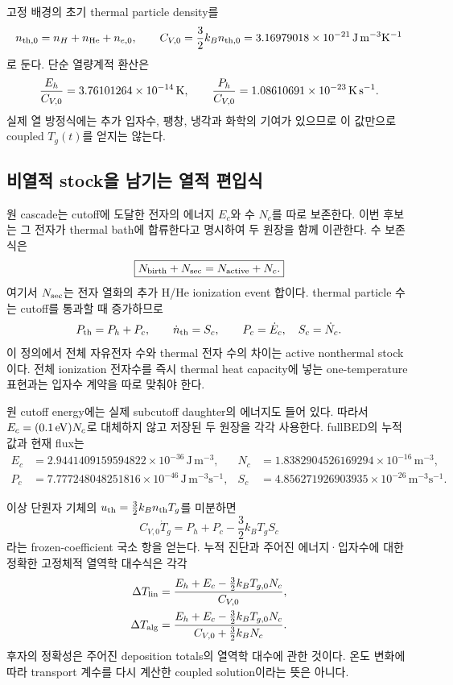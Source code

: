 \documentclass[11pt,a4paper]{article}
\newcommand{\units}[1]{\,\mathrm{#1}}
\begin{document}
고정 배경의 초기 thermal particle density를
\[
n_{\rm th,0}=n_H+n_{\rm He}+n_{e,0},\qquad
C_{V,0}=\frac32k_Bn_{\rm th,0}
=\HeatCapacity\units{J\,m^{-3}K^{-1}}
\]
로 둔다. 단순 열량계적 환산은
\[
\frac{E_h}{C_{V,0}}=\CalorimetricDeltaT\units{K},\qquad
\frac{P_h}{C_{V,0}}=\CalorimetricRate\units{K\,s^{-1}}.
\]
실제 열 방정식에는 추가 입자수, 팽창, 냉각과 화학의 기여가 있으므로 이 값만으로
coupled \(T_g(t)\)를 얻지는 않는다.

\subsection{비열적 stock을 남기는 열적 편입식}

원 cascade는 cutoff에 도달한 전자의 에너지 \(E_c\)와 수 \(N_c\)를 따로 보존한다.
이번 후보는 그 전자가 thermal bath에 합류한다고 명시하여 두 원장을 함께 이관한다.
수 보존식은
\begin{equation}
\boxed{N_{\rm birth}+N_{\rm sec}=N_{\rm active}+N_c.}
\end{equation}
여기서 \(N_{\rm sec}\)는 전자 열화의 추가 H/He ionization event 합이다.
thermal particle 수는 cutoff를 통과할 때 증가하므로
\[
P_{\rm th}=P_h+P_c,\qquad
\dot n_{\rm th}=S_c,\qquad P_c=\dot E_c,\quad S_c=\dot N_c.
\]
이 정의에서 전체 자유전자 수와 thermal 전자 수의 차이는 active nonthermal stock이다.
전체 ionization 전자수를 즉시 thermal heat capacity에 넣는 one-temperature 표현과는
입자수 계약을 따로 맞춰야 한다.\cite{source,therm}

원 cutoff energy에는 실제 subcutoff daughter의 에너지도 들어 있다.
따라서 \(E_c=(0.1\,{\rm eV})N_c\)로 대체하지 않고 저장된 두 원장을 각각 사용한다.
fullBED의 누적 값과 현재 flux는
\begin{align*}
E_c&=2.9441409159594822\times10^{-36}\units{J\,m^{-3}},&
N_c&=1.8382904526169294\times10^{-16}\units{m^{-3}},\\
P_c&=7.777248048251816\times10^{-46}\units{J\,m^{-3}s^{-1}},&
S_c&=4.856271926903935\times10^{-26}\units{m^{-3}s^{-1}}.
\end{align*}

이상 단원자 기체의 \(u_{\rm th}=\frac32k_Bn_{\rm th}T_g\)를 미분하면
\begin{equation}
\boxed{C_{V,0}\dot T_g=P_h+P_c-\frac32k_BT_gS_c}
\end{equation}
라는 frozen-coefficient 국소 항을 얻는다. 누적 진단과 주어진 에너지·입자수에 대한
정확한 고정체적 열역학 대수식은 각각
\begin{align}
\Delta T_{\rm lin}
&=\frac{E_h+E_c-\frac32k_BT_{g,0}N_c}{C_{V,0}},\\
\Delta T_{\rm alg}
&=\frac{E_h+E_c-\frac32k_BT_{g,0}N_c}
{C_{V,0}+\frac32k_BN_c}.
\end{align}
후자의 정확성은 주어진 deposition totals의 열역학 대수에 관한 것이다.
온도 변화에 따라 transport 계수를 다시 계산한 coupled solution이라는 뜻은 아니다.
\end{document}
